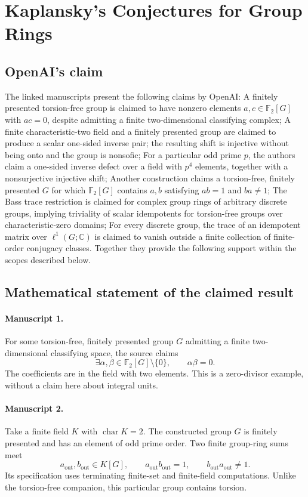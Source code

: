 \documentclass[11pt]{article}
\begin{document}
\section*{Kaplansky's Conjectures for Group Rings}

\subsection{OpenAI's claim}
The linked manuscripts present the following claims by OpenAI: A finitely presented torsion-free group is claimed to have nonzero elements $a,c\in\mathbb F_2[G]$ with $ac=0$, despite admitting a finite two-dimensional classifying complex; A finite characteristic-two field and a finitely presented group are claimed to produce a scalar one-sided inverse pair; the resulting shift is injective without being onto and the group is nonsofic; For a particular odd prime $p$, the authors claim a one-sided inverse defect over a field with $p^4$ elements, together with a nonsurjective injective shift; Another construction claims a torsion-free, finitely presented $G$ for which $\mathbb F_2[G]$ contains $a,b$ satisfying $ab=1$ and $ba\ne1$; The Bass trace restriction is claimed for complex group rings of arbitrary discrete groups, implying triviality of scalar idempotents for torsion-free groups over characteristic-zero domains; For every discrete group, the trace of an idempotent matrix over $\ell^1(G;\mathbb C)$ is claimed to vanish outside a finite collection of finite-order conjugacy classes. Together they provide the following support within the scopes described below.

\subsection{Mathematical statement of the claimed result}
\paragraph{Manuscript 1.}
For some torsion-free, finitely presented group \(G\) admitting a finite two-dimensional classifying space, the source claims
\[
 \exists\alpha,\beta\in\mathbb F_2[G]\setminus\{0\},\qquad\alpha\beta=0.
\]
The coefficients are in the field with two elements. This is a zero-divisor example, without a claim here about integral units.

\paragraph{Manuscript 2.}
Take a finite field \(K\) with \(\operatorname{char}K=2\). The constructed group \(G\) is finitely presented and has an element of odd prime order. Two finite group-ring sums meet
\[
 a_{\mathrm{out}},b_{\mathrm{out}}\in K[G],\qquad
 a_{\mathrm{out}}b_{\mathrm{out}}=1,\qquad
 b_{\mathrm{out}}a_{\mathrm{out}}\ne1.
\]
Its specification uses terminating finite-set and finite-field computations. Unlike the torsion-free companion, this particular group contains torsion.
\end{document}
